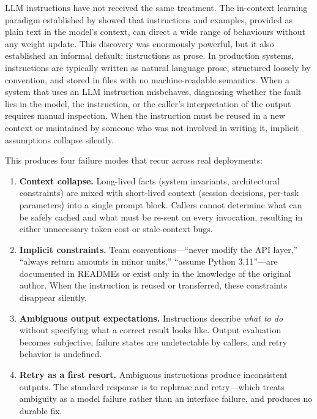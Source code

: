 \documentclass[11pt]{article}
\begin{document}
LLM instructions have not received the same treatment. The in-context learning
paradigm established by \citet{brown2020gpt3} showed that instructions and
examples, provided as plain text in the model's context, can direct a wide range
of behaviours without any weight update. This discovery was enormously powerful,
but it also established an informal default: instructions as prose. In
production systems, instructions are typically written as natural language prose,
structured loosely by convention, and stored in files with no machine-readable
semantics. When a system that
uses an LLM instruction misbehaves, diagnosing whether the fault lies in the
model, the instruction, or the caller's interpretation of the output requires
manual inspection. When the instruction must be reused in a new context or
maintained by someone who was not involved in writing it, implicit assumptions
collapse silently.

This produces four failure modes that recur across real deployments:

\begin{enumerate}[leftmargin=*]
\item \textbf{Context collapse.} Long-lived facts (system invariants,
architectural constraints) are mixed with short-lived context (session
decisions, per-task parameters) into a single prompt block. Callers cannot
determine what can be safely cached and what must be re-sent on every
invocation, resulting in either unnecessary token cost or stale-context bugs.

\item \textbf{Implicit constraints.} Team conventions---``never modify the
API layer,'' ``always return amounts in minor units,'' ``assume Python
3.11''---are documented in READMEs or exist only in the knowledge of the
original author. When the instruction is reused or transferred, these
constraints disappear silently.

\item \textbf{Ambiguous output expectations.} Instructions describe
\emph{what to do} without specifying what a correct result looks like.
Output evaluation becomes subjective, failure states are undetectable by
callers, and retry behavior is undefined.

\item \textbf{Retry as a first resort.} Ambiguous instructions produce
inconsistent outputs. The standard response is to rephrase and retry---which
treats ambiguity as a model failure rather than an interface failure, and
produces no durable fix.
\end{enumerate}
\end{document}
